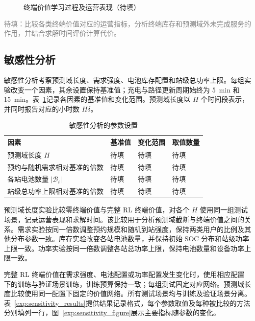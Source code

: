 \documentclass[12pt,a4paper,UTF8]{ctexart}
\numberwithin{equation}{section}
\newcommand{\todoresult}[1]{\textcolor{gray}{#1}}
\begin{document}
\begin{figure}[!htbp]
  \centering
  \caption{终端价值学习过程及运营表现（待填）}
  \label{exp:value_figure}
\end{figure}

\todoresult{待填：比较各类终端价值对应的运营指标，分析终端库存和预测域外未完成服务的作用，并结合求解时间评价计算代价。}

\FloatBarrier
\subsection{敏感性分析}
\label{exp:sensitivity}

敏感性分析考察预测域长度、需求强度、电池库存配置和站级总功率上限。每组实验改变一个因素，其余设置保持基准值；充电与路径更新周期始终为 5~min 和 15~min。表~\ref{exp:sensitivity_settings}记录各因素的基准值和变化范围。预测域长度以 $H$ 个时间段表示，并同时报告对应的小时数 $H\delta$。

\begin{table}[!htbp]
  \centering
  \caption{敏感性分析的参数设置}
  \label{exp:sensitivity_settings}
  \small
  \begin{tabularx}{\linewidth}{@{}Xlll@{}}
    \toprule
    因素 & 基准值 & 变化范围 & 取值数量 \\
    \midrule
    预测域长度 $H$ & 待填 & 待填 & 待填 \\
    预约与随机需求相对基准的倍数 & 待填 & 待填 & 待填 \\
    各站电池数量 $|\mathcal B_i|$ & 待填 & 待填 & 待填 \\
    站级总功率上限相对基准的倍数 & 待填 & 待填 & 待填 \\
    \bottomrule
  \end{tabularx}
\end{table}

预测域长度实验比较零终端价值与完整 RL 终端价值，对各个 $H$ 使用同一组测试场景，记录运营表现和求解时间。该比较用于分析预测域截断与终端价值之间的关系。需求实验按同一倍数调整预约规模和随机到站强度，保持两类用户的比例及其他分布参数一致。库存实验改变各站电池数量，并保持初始 SOC 分布和站级功率上限一致。功率实验按同一倍数调整各站总功率上限，保持电池数量和设备功率上限一致。

完整 RL 终端价值在需求强度、电池配置或功率配置发生变化时，使用相应配置下的训练与验证场景训练，训练预算保持一致；每组测试固定对应网络。预测域长度比较使用同一配置下固定的价值网络。所有测试场景均与训练及验证场景分离。表~\ref{exp:sensitivity_results}提供结果记录格式，每个参数取值及每种被比较的方法分别填列一行，图~\ref{exp:sensitivity_figure}展示主要指标随参数的变化。
\end{document}
